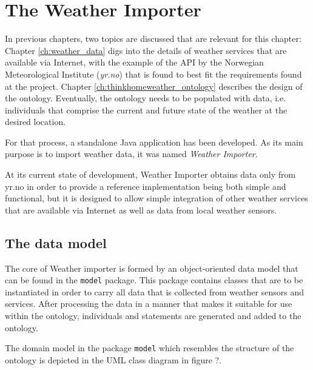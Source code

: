 \chapter{The Weather Importer}
\label{ch:weather}

In previous chapters, two topics are discussed that are relevant for this chapter: Chapter \ref{ch:weather_data} digs into the details of weather services that are available via Internet, with the example of the API by the Norwegian Meteorological Institute (\emph{yr.no}) that is found to best fit the requirements found at the \thinkhome project. Chapter \ref{ch:thinkhomeweather_ontology} describes the design of the \thinkhomeweather ontology. Eventually, the ontology needs to be populated with data, i.e. individuals that comprise the current and future state of the weather at the desired location.

For that process, a standalone Java application has been developed. As its main purpose is to import weather data, it was named \emph{Weather Importer}.

At its current state of development, Weather Importer obtains data only from yr.no in order to provide a reference implementation being both simple and functional, but it is designed to allow simple integration of other weather services that are available via Internet as well as data from local weather sensors.

\section{The data model}

The core of Weather importer is formed by an object-oriented data model that can be found in the \texttt{model} package. This package contains classes that are to be instantiated in order to carry all data that is collected from weather sensors and services. After processing the data in a manner that makes it suitable for use within the \thinkhomeweather ontology, individuals and statements are generated and added to the ontology.

The domain model in the package \texttt{model} which resembles the structure of the \thinkhomeweather ontology is depicted in the UML class diagram in figure ?.

